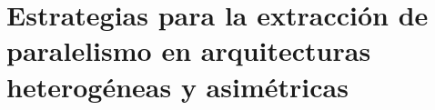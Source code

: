 \cleardoublepage


\chapter{Estrategias para la extracción de paralelismo en arquitecturas heterogéneas y asimétricas}
\label{ch:chapter3}

%
%
%
%




